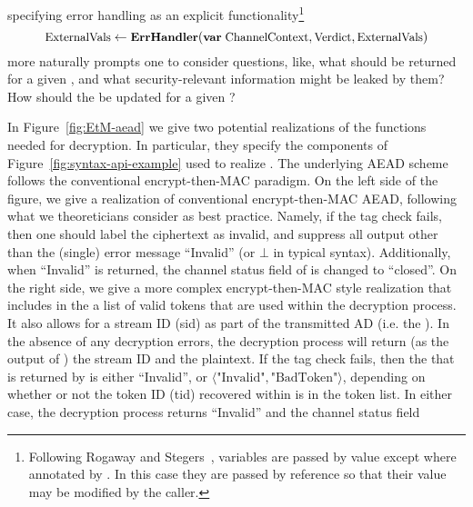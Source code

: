 specifying error handling as an explicit functionality\footnote{Following
Rogaway and Stegers~\cite{RS09}, variables are passed by value except where
annotated by . In this case they are passed by reference so that
their value may be modified by the caller.}
\[
\textrm{\small ExternalVals} \gets
                                  \textrm{\small\bf ErrHandler}(\textrm{\small\bf var}\;
                                  \textrm{\small ChannelContext},
                                  \textrm{\small Verdict}, \textrm{\small ExternalVals})
\]
more naturally prompts one to consider questions, like, what  should
be returned for a given , and what
security-relevant information might be leaked by them?  How should the
 be updated for a given ?


In Figure~\ref{fig:EtM-aead} we give two potential realizations of the
functions needed for decryption. In particular, they specify the components of
Figure~\ref{fig:syntax-api-example} used to realize . The
underlying AEAD scheme follows the conventional encrypt-then-MAC paradigm.
%
On the left side of the figure, we give a realization of conventional
encrypt-then-MAC AEAD, following what we
theoreticians consider as best practice.  Namely, if the tag check fails, then
one should label the ciphertext as invalid, and suppress all output other than
the (single) error message ``Invalid'' (or $\bot$ in typical syntax).
Additionally, when ``Invalid'' is returned, the channel status field
of  is changed to ``closed''.
%
%
On the right side, we give a more complex encrypt-then-MAC style realization that includes
in the  a list of valid tokens that are used within
the decryption process. It also allows for a stream ID (sid) as part
of the transmitted AD (i.e. the ).  In the
absence of any decryption errors, the decryption process will return
(as the output of ) the stream ID and the
plaintext.  If the tag check fails, then the
 that is returned by  is either
``Invalid'', or $\langle\mbox{"Invalid"},\mbox{"BadToken"}\rangle$,
depending on whether or not the token ID (tid) recovered within
 is in the token list.  In either case, the
decryption process returns ``Invalid'' and the channel status field
